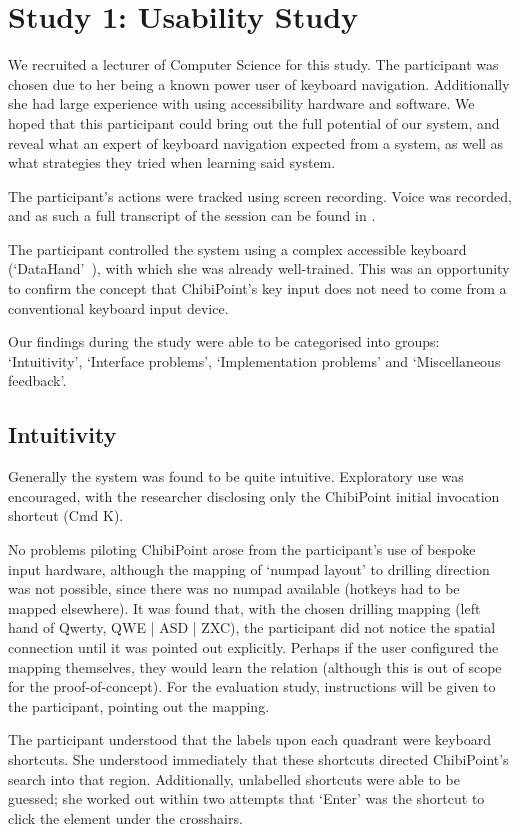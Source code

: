 \documentclass[11pt,openright,a4paper]{report}
\begin{document}
\section{Study 1: Usability Study}
We recruited a lecturer of Computer Science for this study. The participant was chosen due to her being a known power user of keyboard navigation. Additionally she had large experience with using accessibility hardware and software. We hoped that this participant could bring out the full potential of our system, and reveal what an expert of keyboard navigation expected from a system, as well as what strategies they tried when learning said system.

The participant's actions were tracked using screen recording. Voice was recorded, and as such a full transcript of the session can be found in .

The participant controlled the system using a complex accessible keyboard (`DataHand'~\cite{datahand}), with which she was already well-trained. This was an opportunity to confirm the concept that ChibiPoint's key input does not need to come from a conventional keyboard input device.

Our findings during the study were able to be categorised into groups: `Intuitivity', `Interface problems', `Implementation problems' and `Miscellaneous feedback'.

\subsection{Intuitivity}
Generally the system was found to be quite intuitive. Exploratory use was encouraged, with the researcher disclosing only the ChibiPoint initial invocation shortcut (Cmd K).

No problems piloting ChibiPoint arose from the participant's use of bespoke input hardware, although the mapping of `numpad layout' to drilling direction was not possible, since there was no numpad available (hotkeys had to be mapped elsewhere). It was found that, with the chosen drilling mapping (left hand of Qwerty, QWE | ASD | ZXC), the participant did not notice the spatial connection until it was pointed out explicitly. Perhaps if the user configured the mapping themselves, they would learn the relation (although this is out of scope for the proof-of-concept). For the evaluation study, instructions will be given to the participant, pointing out the mapping.

The participant understood that the labels upon each quadrant were keyboard shortcuts. She understood immediately that these shortcuts directed ChibiPoint's search into that region. Additionally, unlabelled shortcuts were able to be guessed; she worked out within two attempts that `Enter' was the shortcut to click the element under the crosshairs.
\end{document}
